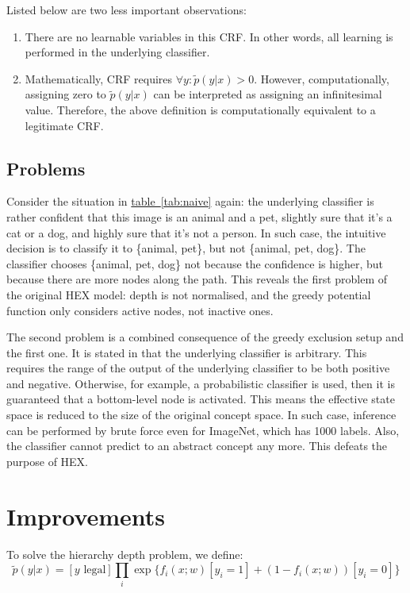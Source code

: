 \documentclass[11pt,a4paper]{article}
\begin{document}
Listed below are two less important observations:
\begin{enumerate}
\item There are no learnable variables in this CRF. In other words, all learning is performed in the underlying classifier.
\item Mathematically, CRF requires $\forall y:\tilde{p}(y|x)>0$. However, computationally, assigning zero to $\tilde{p}(y|x)$ can be interpreted as assigning an infinitesimal value. Therefore, the above definition is computationally equivalent to a legitimate CRF.
\end{enumerate}

\subsection{Problems}

Consider the situation in \hyperref[tab:naive]{table~\ref{tab:naive}} again: the underlying classifier is rather confident that this image is an animal and a pet, slightly sure that it's a cat or a dog, and highly sure that it's not a person. In such case, the intuitive decision is to classify it to \{animal, pet\}, but not \{animal, pet, dog\}. The classifier chooses \{animal, pet, dog\} not because the confidence is higher, but because there are more nodes along the path. This reveals the first problem of the original HEX model: depth is not normalised, and the greedy potential function only considers active nodes, not inactive ones.

The second problem is a combined consequence of the greedy exclusion setup and the first one. It is stated in \cite{deng2014large} that the underlying classifier is arbitrary. This requires the range of the output of the underlying classifier to be both positive and negative. Otherwise, for example, a probabilistic classifier is used, then it is guaranteed that a bottom-level node is activated. This means the effective state space is reduced to the size of the original concept space. In such case, inference can be performed by brute force even for ImageNet, which has 1000 labels. Also, the classifier cannot predict to an abstract concept any more. This defeats the purpose of HEX.

\section{Improvements}

To solve the hierarchy depth problem, we define:
\[\tilde{p}(y|x)=[y\text{ legal}]\prod_i\exp\{f_i(x;w)[y_i=1]+(1-f_i(x;w))[y_i=0]\}\]
\end{document}
